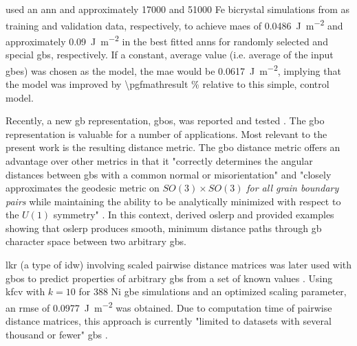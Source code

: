 \documentclass[final,twocolumn,12pt]{elsarticle}
\newcommand{\calcnum}[1]{%
    \pgfmathparse{#1}%
    \num[round-mode=places,round-precision=1]{\pgfmathresult}%
}
\newcommand{\inpt}{input}
\begin{document}
\citet{restrepoUsingArtificialNeural2014} used an \gls{ann} and approximately \num{17000} and \num{51000} Fe bicrystal simulations from \citet{kimIdentificationSchemeGrain2011} as training and validation data, respectively, to achieve \glspl{mae} of \SI{0.0486}{\J\per\square\meter} and approximately \SI{0.09}{\J\per\square\meter} in the best fitted \glspl{ann} for randomly selected and special \glspl{gb}, respectively. If a constant, average value (i.e. average of the \inpt{} \glspl{gbe}) was chosen as the model, the \gls{mae} would be \SI{0.0617}{\J\per\square\meter}, implying that the model was improved by \calcnum{(0.0486-0.0617)/0.0617*100}\% relative to this simple, control model.

Recently, a new \gls{gb} representation, \glspl{gbo}, was reported \cite{francisGeodesicOctonionMetric2019} and tested \cite{chesserLearningGrainBoundary2020}. The \gls{gbo} representation is valuable for a number of applications. Most relevant to the present work is the resulting distance metric. The \gls{gbo} distance metric offers an advantage over other metrics in that it "correctly determines the angular distances between \glspl{gb} with a common normal or misorientation" and "closely approximates the geodesic metric on $SO(3) \times SO(3)$ \textit{for all grain boundary pairs} while maintaining the ability to be analytically minimized with respect to the $U(1)$ symmetry" \cite{francisGeodesicOctonionMetric2019}. In this context, \citet{francisGeodesicOctonionMetric2019} derived \gls{oslerp} and provided examples showing that \gls{oslerp} produces smooth, minimum distance paths through \gls{gb} character space between two arbitrary \glspl{gb}. 

\Gls{lkr} (a type of \gls{idw}) involving scaled pairwise distance matrices was later used with \glspl{gbo} to predict properties of arbitrary \glspl{gb} from a set of known values \cite{chesserLearningGrainBoundary2020}. Using \gls{kfcv} with $k=10$ for \num{388} Ni \gls{gbe} simulations \cite{olmstedSurveyComputedGrain2009a} and an optimized scaling parameter, an \gls{rmse} of \SI{0.0977}{\J\per\square\meter} was obtained. Due to computation time of pairwise distance matrices, this approach is currently "limited to datasets with several thousand or fewer" \glspl{gb} \cite{chesserLearningGrainBoundary2020}.
\end{document}
